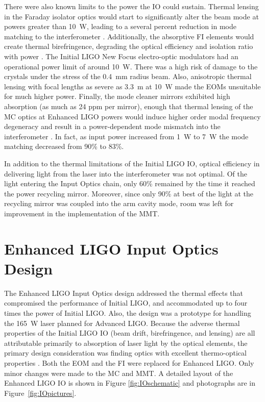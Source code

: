 There were also known limits to the power the IO could sustain.
Thermal lensing in the Faraday isolator optics would start to
significantly alter the beam mode at powers greater than 10~W, leading
to a several percent reduction in mode matching to the interferometer
\citep{UFLIGOGroup2006Upgrading}.  Additionally, the absorptive FI
elements would create thermal birefringence, degrading the optical
efficiency and isolation ratio with power
\citep{Khazanov1999Investigation}.  The Initial LIGO New Focus
electro-optic modulators had an operational power limit of around
10~W. There was a high risk of damage to the crystals under the stress
of the 0.4~mm radius beam. Also, anisotropic thermal lensing with
focal lengths as severe as 3.3~m at 10~W made the EOMs unsuitable for
much higher power. Finally, the mode cleaner mirrors exhibited high
absorption (as much as 24 ppm per mirror), enough that thermal lensing
of the MC optics at Enhanced LIGO powers would induce higher order
modal frequency degeneracy and result in a power-dependent mode
mismatch into the interferometer \citep{Bullington2008Modal,
  Arain2007Note}. In fact, as input power increased from 1~W to 7~W
the mode matching decreased from 90\% to 83\%.

In addition to the thermal limitations of the Initial LIGO IO, optical
efficiency in delivering light from the laser into the interferometer
was not optimal. Of the light entering the Input Optics chain, only
60\% remained by the time it reached the power recycling
mirror. Moreover, since only 90\% at best of the light at the
recycling mirror was coupled into the arm cavity mode, room was left
for improvement in the implementation of the MMT.



\section{Enhanced LIGO Input Optics Design}
\label{sec:design}
The Enhanced LIGO Input Optics design addressed the thermal effects
that compromised the performance of Initial LIGO, and accommodated up
to four times the power of Initial LIGO. Also, the design was a
prototype for handling the 165~W laser planned for Advanced
LIGO. Because the adverse thermal properties of the Initial LIGO IO
(beam drift, birefringence, and lensing) are all attributable
primarily to absorption of laser light by the optical elements, the
primary design consideration was finding optics with excellent
thermo-optical properties \citep{UFLIGOGroup2006Upgrading}. Both the
EOM and the FI were replaced for Enhanced LIGO. Only minor changes
were made to the MC and MMT. A detailed layout of the Enhanced LIGO IO
is shown in Figure \ref{fig:IOschematic} and photographs are in
Figure~\ref{fig:IOpictures}.

